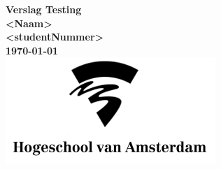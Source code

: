 \begin{titlepage}
  \centering
    \vfill
    {\bfseries\Huge
      Verslag Testing\\
        \vskip2cm
      }
      {\bfseries\Large
       <Naam>\\
      }
      {
        \bfseries\normalsize
        <studentNummer>\\
        \vskip1cm
        \today\\
    }    
    \vfill
    \includegraphics[height=4cm]{images/hva-logo-png-7.png} %
    \vfill
    \vfill
\end{titlepage}
\newpage
